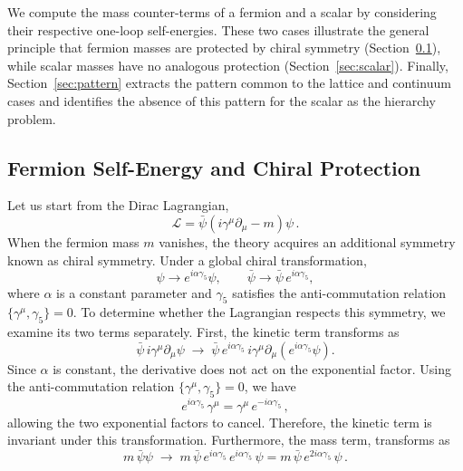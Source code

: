 \documentclass[a4paper, 11pt]{article}
\begin{document}
We compute the mass counter-terms of a fermion and a scalar by considering their respective one-loop self-energies. These two cases illustrate the general principle that fermion masses are protected by chiral symmetry (Section~\ref{sec:fermion}), while scalar masses have no analogous protection (Section~\ref{sec:scalar}). Finally, Section~\ref{sec:pattern} extracts the pattern common to the lattice and continuum cases and identifies the absence of this pattern for the scalar as the hierarchy problem.


\subsection{Fermion Self-Energy and Chiral Protection}
\label{sec:fermion}

Let us start from the Dirac Lagrangian,
\begin{equation*}
  \mathcal{L} = \bar{\psi}(i\gamma^\mu\partial_\mu - m)\psi\,.
  \label{eq:dirac_lagrangian}
\end{equation*}
When the fermion mass $m$ vanishes, the theory acquires an additional symmetry known as chiral symmetry. Under a global chiral transformation,
\begin{equation}
  \psi \to e^{i\alpha\gamma_5}\psi, \qquad
  \bar{\psi} \to \bar{\psi}\,e^{i\alpha\gamma_5},
  \label{eq:chiral_sym}
\end{equation}
where $\alpha$ is a constant parameter and $\gamma_5$ satisfies the anti-commutation relation $\{\gamma^\mu, \gamma_5\} = 0$. To determine whether the Lagrangian respects this symmetry, we examine its two terms separately. First, the kinetic term transforms as
\begin{equation*}
  \bar{\psi}\,i\gamma^\mu\partial_\mu\psi
  \;\to\;
  \bar{\psi}\,e^{i\alpha\gamma_5}\,i\gamma^\mu\partial_\mu
  \left(e^{i\alpha\gamma_5}\psi\right).
\end{equation*}
Since $\alpha$ is constant, the derivative does not act on the exponential factor. Using the anti-commutation relation $\{\gamma^\mu, \gamma_5\} = 0$, we have
\begin{equation*}
  e^{i\alpha\gamma_5}\,\gamma^\mu = \gamma^\mu\,e^{-i\alpha\gamma_5}\,,
\end{equation*}
allowing the two exponential factors to cancel. Therefore, the kinetic term is invariant under this transformation. Furthermore, the mass term, transforms as
\begin{equation*}
  m\,\bar{\psi}\psi
  \;\to\;
  m\,\bar{\psi}\,e^{i\alpha\gamma_5}\,e^{i\alpha\gamma_5}\,\psi
  = m\,\bar{\psi}\,e^{2i\alpha\gamma_5}\,\psi\,.
\end{equation*}
\end{document}
